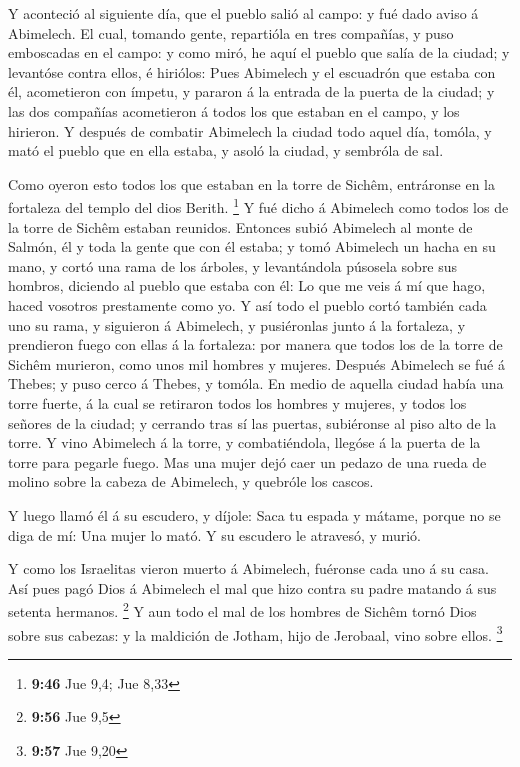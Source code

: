  Y aconteció al siguiente día, que el pueblo salió al
campo: y fué dado aviso á Abimelech.  El cual, tomando
gente, repartióla en tres compañías, y puso emboscadas en el campo: y
como miró, he aquí el pueblo que salía de la ciudad; y levantóse contra
ellos, é hiriólos:  Pues Abimelech y el escuadrón que
estaba con él, acometieron con ímpetu, y pararon á la entrada de la
puerta de la ciudad; y las dos compañías acometieron á todos los que
estaban en el campo, y los hirieron.  Y después de combatir
Abimelech la ciudad todo aquel día, tomóla, y mató el pueblo que en ella
estaba, y asoló la ciudad, y sembróla de sal.

 Como oyeron esto todos los que estaban en la torre de
Sichêm, entráronse en la fortaleza del templo del dios Berith.
\footnote{\textbf{9:46} Jue 9,4; Jue 8,33}  Y fué dicho á
Abimelech como todos los de la torre de Sichêm estaban reunidos.
 Entonces subió Abimelech al monte de Salmón, él y toda la
gente que con él estaba; y tomó Abimelech un hacha en su mano, y cortó
una rama de los árboles, y levantándola púsosela sobre sus hombros,
diciendo al pueblo que estaba con él: Lo que me veis á mí que hago,
haced vosotros prestamente como yo.  Y así todo el pueblo
cortó también cada uno su rama, y siguieron á Abimelech, y pusiéronlas
junto á la fortaleza, y prendieron fuego con ellas á la fortaleza: por
manera que todos los de la torre de Sichêm murieron, como unos mil
hombres y mujeres.  Después Abimelech se fué á Thebes; y
puso cerco á Thebes, y tomóla.  En medio de aquella ciudad
había una torre fuerte, á la cual se retiraron todos los hombres y
mujeres, y todos los señores de la ciudad; y cerrando tras sí las
puertas, subiéronse al piso alto de la torre.  Y vino
Abimelech á la torre, y combatiéndola, llegóse á la puerta de la torre
para pegarle fuego.  Mas una mujer dejó caer un pedazo de
una rueda de molino sobre la cabeza de Abimelech, y quebróle los cascos.

 Y luego llamó él á su escudero, y díjole: Saca tu espada y
mátame, porque no se diga de mí: Una mujer lo mató. Y su escudero le
atravesó, y murió.

 Y como los Israelitas vieron muerto á Abimelech, fuéronse
cada uno á su casa.  Así pues pagó Dios á Abimelech el mal
que hizo contra su padre matando á sus setenta hermanos. \footnote{\textbf{9:56}
  Jue 9,5}  Y aun todo el mal de los hombres de Sichêm
tornó Dios sobre sus cabezas: y la maldición de Jotham, hijo de
Jerobaal, vino sobre ellos. \footnote{\textbf{9:57} Jue 9,20}

